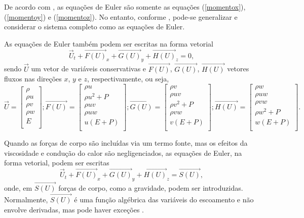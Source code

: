 De acordo com , as equações de Euler são somente as equações (\ref{momentox}), (\ref{momentoy}) e (\ref{momentoz}). No entanto, conforme , pode-se generalizar e considerar o sistema completo como as equações de Euler.

As equações de Euler também podem ser escritas na forma vetorial
\begin{equation} \label{vetorEuler}
\vec{U}_t + \vec{F(U)}_x + \vec{G(U)}_y + \vec{H(U)}_z = 0,
\end{equation}
sendo $ \vec{U} $ um vetor de variáveis conservativas e $ \vec{F(U)}$, $ \vec{G(U)}$, $ \vec{H(U)}$ vetores fluxos nas direções $x$, $y$ e $z$, respectivamente, ou seja,
\begin{equation}
\vec{U} =  \left[ 
\begin{array}{c}
\rho \\
\rho u \\
\rho v \\
\rho w \\
\textit{E} \\
\end{array}
\right] ; 
\vec{F(U)} =  \left[ 
\begin{array}{c}
\rho u \\
\rho u^2 + P \\
\rho uv \\
\rho uw \\
u ( \textit{E} + P ) \\
\end{array}
\right] ;  
\vec{G(U)} =  \left[ 
\begin{array}{c}
\rho v \\
\rho uv \\
\rho v^2 + P \\
\rho vw \\
v ( \textit{E} + P ) \\
\end{array}
\right] ;
 \vec{H(U)} =  \left[ 
\begin{array}{c}
\rho w \\
\rho uw \\
\rho vw \\
\rho w^2 + P \\
w ( \textit{E} + P ) \\
\end{array}
\right]. 
\end{equation}

Quando as forças de corpo são incluídas via um termo fonte, mas os efeitos da viscosidade e condução do calor são negligenciados, as equações de Euler, na forma vetorial, podem ser escritas
\begin{equation} \label{vetorFonte}
\vec{U}_t + \vec{F(U)}_x + \vec{G(U)}_y + \vec{H(U)}_z = \vec{S(U)},
\end{equation}
onde, em $ \vec{S(U)} $ forças de corpo, como a gravidade, podem ser introduzidas. Normalmente, $ \vec{S(U)} $ é uma função algébrica das variáveis do escoamento e não envolve derivadas, mas pode haver exceções \cite{Toro}.

